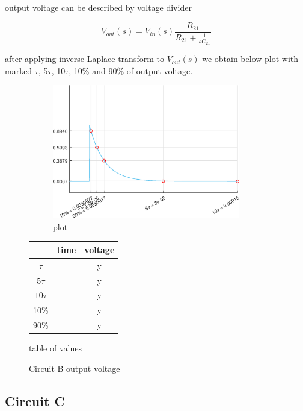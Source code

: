 \documentclass[notitlepage, a4paper, 11pt]{article}
\begin{document}
	output voltage can be described by voltage divider
	
	\begin{equation}
		V_{out}(s) = V_{in}(s) \dfrac{R_{21}}{R_{21} + \frac{1}{sC_{21}}}
	\end{equation}
	
		after applying inverse Laplace transform to $V_{out}(s)$ we obtain below plot with marked $\tau$, 5$\tau$, 10$\tau$, 10\% and 90\% of output voltage.
	
	\begin{figure}[H]
	\centering
	\begin{subfigure}{0.6\textwidth}
		\includegraphics[width=0.9\textwidth]{../Matlab/img/CircuitB.eps}
		\caption{plot}
	\end{subfigure}
	\hfill
	\begin{subtable}{0.38\textwidth}
		\centering
		\begin{tabular}{|c|c|c|}
			\hline
			 & time & voltage \\
			\hline
			$\tau$ & & y \\
			\hline		
			$5\tau$ & & y \\
			\hline
			$10\tau$ & & y \\
			\hline
			10\% & & y \\
			\hline
			90\% & & y \\
			\hline
		\end{tabular}
		\caption{table of values}
	\end{subtable}
	\caption{Circuit B output voltage}
\end{figure}
	
	\subsection{Circuit C}
	
\end{document}
